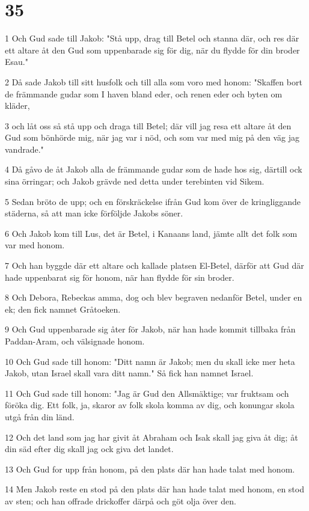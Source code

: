 \chapter{35}

\par 1 Och Gud sade till Jakob: "Stå upp, drag till Betel och stanna där, och res där ett altare åt den Gud som uppenbarade sig för dig, när du flydde för din broder Esau."
\par 2 Då sade Jakob till sitt husfolk och till alla som voro med honom: "Skaffen bort de främmande gudar som I haven bland eder, och renen eder och byten om kläder,
\par 3 och låt oss så stå upp och draga till Betel; där vill jag resa ett altare åt den Gud som bönhörde mig, när jag var i nöd, och som var med mig på den väg jag vandrade."
\par 4 Då gåvo de åt Jakob alla de främmande gudar som de hade hos sig, därtill ock sina örringar; och Jakob grävde ned detta under terebinten vid Sikem.
\par 5 Sedan bröto de upp; och en förskräckelse ifrån Gud kom över de kringliggande städerna, så att man icke förföljde Jakobs söner.
\par 6 Och Jakob kom till Lus, det är Betel, i Kanaans land, jämte allt det folk som var med honom.
\par 7 Och han byggde där ett altare och kallade platsen El-Betel, därför att Gud där hade uppenbarat sig för honom, när han flydde för sin broder.
\par 8 Och Debora, Rebeckas amma, dog och blev begraven nedanför Betel, under en ek; den fick namnet Gråtoeken.
\par 9 Och Gud uppenbarade sig åter för Jakob, när han hade kommit tillbaka från Paddan-Aram, och välsignade honom.
\par 10 Och Gud sade till honom: "Ditt namn är Jakob; men du skall icke mer heta Jakob, utan Israel skall vara ditt namn." Så fick han namnet Israel.
\par 11 Och Gud sade till honom: "Jag är Gud den Allsmäktige; var fruktsam och föröka dig. Ett folk, ja, skaror av folk skola komma av dig, och konungar skola utgå från din länd.
\par 12 Och det land som jag har givit åt Abraham och Isak skall jag giva åt dig; åt din säd efter dig skall jag ock giva det landet.
\par 13 Och Gud for upp från honom, på den plats där han hade talat med honom.
\par 14 Men Jakob reste en stod på den plats där han hade talat med honom, en stod av sten; och han offrade drickoffer därpå och göt olja över den.
